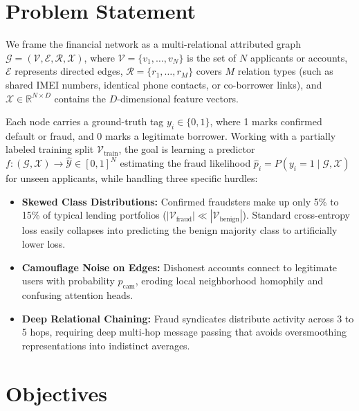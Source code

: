 \section[Problem Statement]{\textbf{Problem Statement}}
\label{sec:problem_statement}

We frame the financial network as a multi-relational attributed graph $\mathcal{G} = (\mathcal{V}, \mathcal{E}, \mathcal{R}, \mathcal{X})$, where $\mathcal{V} = \{v_1, \dots, v_N\}$ is the set of $N$ applicants or accounts, $\mathcal{E}$ represents directed edges, $\mathcal{R} = \{r_1, \dots, r_M\}$ covers $M$ relation types (such as shared IMEI numbers, identical phone contacts, or co-borrower links), and $\mathcal{X} \in \mathbb{R}^{N \times D}$ contains the $D$-dimensional feature vectors.

Each node carries a ground-truth tag $y_i \in \{0, 1\}$, where 1 marks confirmed default or fraud, and 0 marks a legitimate borrower. Working with a partially labeled training split $\mathcal{V}_{\text{train}}$, the goal is learning a predictor $f: (\mathcal{G}, \mathcal{X}) \rightarrow \hat{\mathcal{Y}} \in [0, 1]^N$ estimating the fraud likelihood $\hat{p}_i = P(y_i = 1 \mid \mathcal{G}, \mathcal{X})$ for unseen applicants, while handling three specific hurdles:
\begin{itemize}
    \item \textbf{Skewed Class Distributions:} Confirmed fraudsters make up only 5\% to 15\% of typical lending portfolios ($|\mathcal{V}_{\text{fraud}}| \ll |\mathcal{V}_{\text{benign}}|$). Standard cross-entropy loss easily collapses into predicting the benign majority class to artificially lower loss.
    \item \textbf{Camouflage Noise on Edges:} Dishonest accounts connect to legitimate users with probability $p_{\text{cam}}$, eroding local neighborhood homophily and confusing attention heads.
    \item \textbf{Deep Relational Chaining:} Fraud syndicates distribute activity across 3 to 5 hops, requiring deep multi-hop message passing that avoids oversmoothing representations into indistinct averages.
\end{itemize}

\section[Objectives]{\textbf{Objectives}}
\label{sec:objectives}

